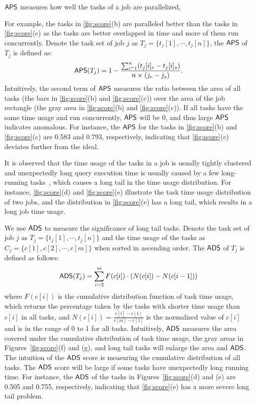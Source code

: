  ${\mathsf{APS}}$ measures how well the tasks of a job are parallelized, 

For example, the tasks in \autoref{fig:score}(b) are paralleled better than the tasks in \autoref{fig:score}(c) as the tasks are better overlapped in time and more of them run concurrently. Denote the task set of job $j$ as $T_j = \{t_j[1], \cdots, t_j[n]\}$, the ${\mathsf{APS}}$ of $T_j$ is defined as:
$${\mathsf{APS}}(T_j) = 1 - \frac{\sum_{i^=1}^{n} (t_j[i]_e - t_j[i]_s)}{n \times (j_e - j_s)}.$$
Intuitively, the second term of ${\mathsf{APS}}$ measures the ratio between the area of all tasks (the bars in \autoref{fig:score}(b) and \autoref{fig:score}(c)) over the area of the job rectangle (the gray area in \autoref{fig:score}(b) and \autoref{fig:score}(c)). If all tasks have the same time usage and run concurrently, ${\mathsf{APS}}$ will be 0, and thus large ${\mathsf{APS}}$ indicates anomalous. For instance, the ${\mathsf{APS}}$ for the tasks in \autoref{fig:score}(b) and \autoref{fig:score}(c) are 0.583 and 0.793, respectively, indicating that \autoref{fig:score}(c) deviates further from the ideal.    



It is observed that the time usage of the tasks in a job is
 usually tightly clustered and unexpectedly long query execution time is usually caused by a few long-running tasks~\cite{tan2010visual}, which causes a long tail in the time usage distribution.
For instance, \autoref{fig:score}(d) and \autoref{fig:score}(e) illustrate the task time usage distribution of two jobs, and the distribution in \autoref{fig:score}(e) has a long tail, which results in a long job time usage.

We use ${\mathsf{ADS}}$ to measure the significance of long tail tasks.
Denote the task set of job $j$ as $T_j = \{t_j[1], \cdots, t_j[n]\}$ and the time usage of the tasks as $C_j = \{c[1], c[2], \cdots, c[m] \}$ when sorted in ascending order. The ${\mathsf{ADS}}$ of $T_j$ is defined as follows:
$$
{\mathsf{ADS}}(T_j) =\sum_{i=2}^{m}  F(c[i]) \cdot (N(c[i]) - N(c[i-1]))
$$
where $F(c[i])$ is the cumulative distribution function of task time usage, which returns the percentage taken by the tasks with shorter time usage than $c[i]$ in all tasks, and
$N(c[i]) = \frac{c[i]-c[1]}{c[m]-c[1]}$ is the normalized value of $c[i]$ and is in the range of 0 to 1 for all tasks. Intuitively, ${\mathsf{ADS}}$ measures the area covered under the cumulative distribution of task time usage, the gray areas in Figures~\ref{fig:score}(f) and (g), and long tail tasks will enlarge the area and ${\mathsf{ADS}}$.  
The intuition of the ${\mathsf{ADS}}$ score is measuring the cumulative distribution of all tasks. 
The ${\mathsf{ADS}}$ score will be large if some tasks have unexpectedly long running time. For instance, the ${\mathsf{ADS}}$ of the tasks in Figures~\ref{fig:score}(d) and (e) are 0.505 and 0.755, respectively, indicating that \autoref{fig:score}(e) has a more severe long tail problem.     


